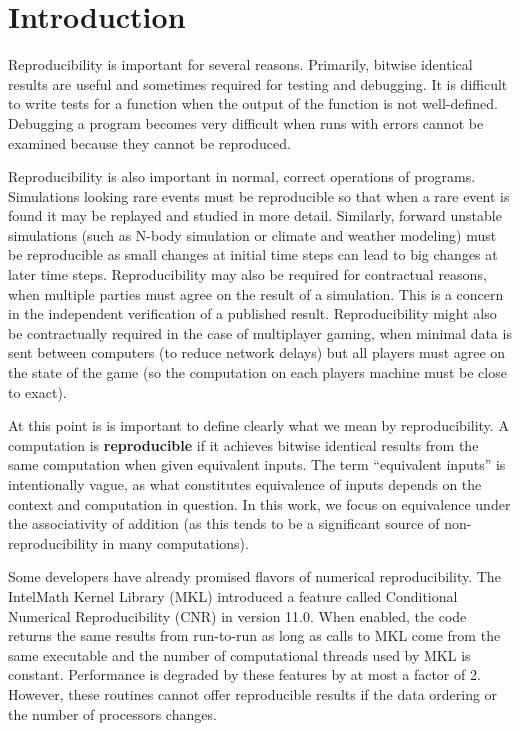 \section{Introduction}
  Reproducibility is important for several reasons. Primarily, bitwise identical results are useful and sometimes required for testing and debugging. It is difficult to write tests for a function when the output of the function is not well-defined. Debugging a program becomes very difficult when runs with errors cannot be examined because they cannot be reproduced. \cite{reproducibilityBOF}

  Reproducibility is also important in normal, correct operations of programs. Simulations looking rare events must be reproducible so that when a rare event is found it may be replayed and studied in more detail. Similarly, forward unstable simulations (such as N-body simulation or climate and weather modeling) must be reproducible as small changes at initial time steps can lead to big changes at later time steps. Reproducibility may also be required for contractual reasons, when multiple parties must agree on the result of a simulation. This is a concern in the independent verification of a published result.
Reproducibility might also be contractually required in the case of multiplayer gaming, when minimal data is sent between computers (to reduce network delays) but all players must agree on the state of the game (so the computation on each players machine must be close to exact).

  At this point is is important to define clearly what we mean by reproducibility. A computation is \textbf{reproducible} if it achieves bitwise identical results from the same computation when given equivalent inputs. The term ``equivalent inputs'' is intentionally vague, as what constitutes equivalence of inputs depends on the context and computation in question. In this work, we focus on equivalence under the associativity of addition (as this tends to be a significant source of non-reproducibility in many computations). 

  Some developers have already promised flavors of numerical reproducibility. The Intel\textregistered Math Kernel Library (MKL) introduced a feature called Conditional Numerical Reproducibility (CNR) in version 11.0. \cite{MKL} When enabled, the code returns the same results from run-to-run as long as calls to MKL come from the same executable and the number of computational threads used by MKL is constant. Performance is degraded by these features by at most a factor of 2. However, these routines cannot offer reproducible results if the data ordering or the number of processors changes.

